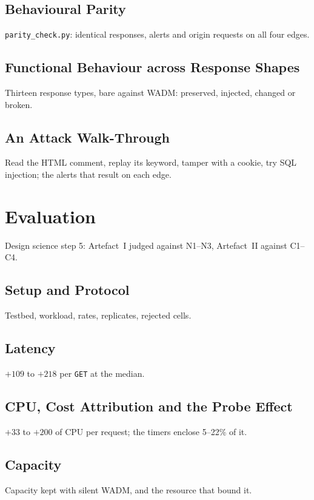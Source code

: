 \documentclass{rptuma}
\begin{document}
\section{Behavioural Parity}
\texttt{parity\_check.py}: identical responses, alerts and origin requests on all four edges.

\section{Functional Behaviour across Response Shapes}
Thirteen response types, bare against WADM: preserved, injected, changed or broken.

\section{An Attack Walk-Through}
Read the HTML comment, replay its keyword, tamper with a cookie, try SQL injection; the alerts
that result on each edge.

\chapter{Evaluation}
Design science step 5: Artefact~I judged against N1--N3, Artefact~II against C1--C4.

\section{Setup and Protocol}
Testbed, workload, rates, replicates, rejected cells.
\section{Latency}
$+109$ to $+218$\us{} per \texttt{GET} at the median.
\section{CPU, Cost Attribution and the Probe Effect}
$+33$ to $+200$\us{} of CPU per request; the timers enclose 5--22\% of it.
\section{Capacity}
Capacity kept with silent WADM, and the resource that bound it.
\end{document}
